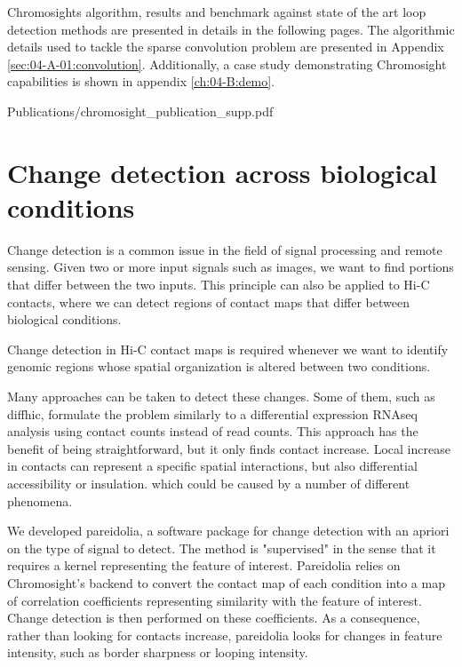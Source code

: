 Chromosights algorithm, results and benchmark against state of the art loop detection methods are presented in details in the following pages. The algorithmic details used to tackle the sparse convolution problem are presented in Appendix \ref{sec:04-A-01:convolution}. Additionally, a case study demonstrating Chromosight capabilities is shown in appendix \ref{ch:04-B:demo}.


     {Publications/chromosight_publication_supp.pdf}    

\section{Change detection across biological conditions}

Change detection is a common issue in the field of signal processing and remote sensing. Given two or more input signals such as images, we want to find portions that differ between the two inputs. This principle can also be applied to Hi-C contacts, where we can detect regions of contact maps that differ between biological conditions.

Change detection in Hi-C contact maps is required whenever we want to identify genomic regions whose spatial organization is altered between two conditions.

Many approaches can be taken to detect these changes. Some of them, such as diffhic, formulate the problem similarly to a differential expression RNAseq analysis using contact counts instead of read counts. This approach has the benefit of being straightforward, but it only finds contact increase. Local increase in contacts can represent a specific spatial interactions, but also differential accessibility or insulation. which could be caused by a number of different phenomena.

We developed pareidolia, a software package for change detection with an apriori on the type of signal to detect. The method is "supervised" in the sense that it requires a kernel representing the feature of interest. Pareidolia relies on Chromosight's backend to convert the contact map of each condition into a map of correlation coefficients representing similarity with the feature of interest. Change detection is then performed on these coefficients. As a consequence, rather than looking for contacts increase, pareidolia looks for changes in feature intensity, such as border sharpness or looping intensity.

